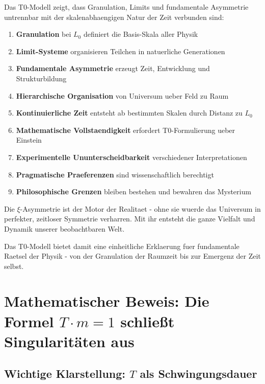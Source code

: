 \documentclass[12pt,a4paper]{article}
\newcommand{\xipar}{\xi}
\newcommand{\Lzero}{L_0}
\theoremstyle{definition}
\theoremstyle{remark}
\begin{document}
	Das T0-Modell zeigt, dass Granulation, Limits und fundamentale Asymmetrie untrennbar mit der skalenabhaengigen Natur der Zeit verbunden sind:
	
	\begin{enumerate}
		\item \textbf{Granulation} bei $\Lzero$ definiert die Basis-Skala aller Physik
		\item \textbf{Limit-Systeme} organisieren Teilchen in natuerliche Generationen
		\item \textbf{Fundamentale Asymmetrie} erzeugt Zeit, Entwicklung und Strukturbildung
		\item \textbf{Hierarchische Organisation} von Universum ueber Feld zu Raum
		\item \textbf{Kontinuierliche Zeit} entsteht ab bestimmten Skalen durch Distanz zu $\Lzero$
		\item \textbf{Mathematische Vollstaendigkeit} erfordert T0-Formulierung ueber Einstein
		\item \textbf{Experimentelle Ununterscheidbarkeit} verschiedener Interpretationen
		\item \textbf{Pragmatische Praeferenzen} sind wissenschaftlich berechtigt
		\item \textbf{Philosophische Grenzen} bleiben bestehen und bewahren das Mysterium
	\end{enumerate}
	
	Die $\xipar$-Asymmetrie ist der Motor der Realitaet - ohne sie wuerde das Universum in perfekter, zeitloser Symmetrie verharren. Mit ihr entsteht die ganze Vielfalt und Dynamik unserer beobachtbaren Welt.
	
	Das T0-Modell bietet damit eine einheitliche Erklaerung fuer fundamentale Raetsel der Physik - von der Granulation der Raumzeit bis zur Emergenz der Zeit selbst.

\section{Mathematischer Beweis: Die Formel $T \cdot m = 1$ schließt Singularitäten aus}

\subsection{Wichtige Klarstellung: $T$ als Schwingungsdauer}
\end{document}
